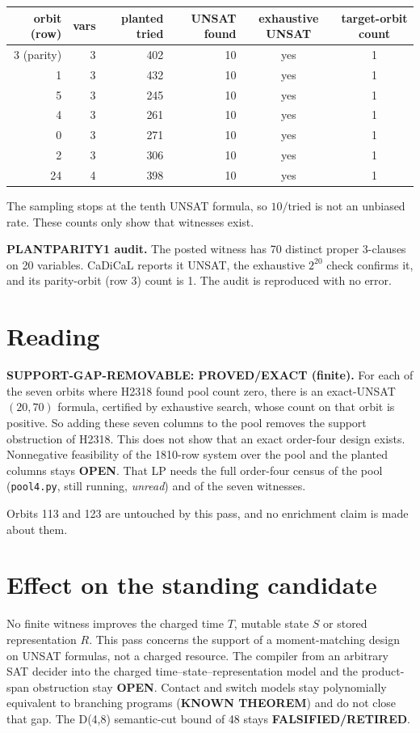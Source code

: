 \documentclass[11pt]{article}
\begin{document}
\begin{center}\begin{tabular}{rrrrcc}\toprule
orbit (row) & vars & planted tried & UNSAT found & exhaustive UNSAT & target-orbit count\\\midrule
3 (parity) & 3 & 402 & 10 & yes & 1\\
1 & 3 & 432 & 10 & yes & 1\\
5 & 3 & 245 & 10 & yes & 1\\
4 & 3 & 261 & 10 & yes & 1\\
0 & 3 & 271 & 10 & yes & 1\\
2 & 3 & 306 & 10 & yes & 1\\
24 & 4 & 398 & 10 & yes & 1\\\bottomrule
\end{tabular}\end{center}
The sampling stops at the tenth UNSAT formula, so $10/\text{tried}$ is not an unbiased rate. These counts only show that witnesses exist.

\textbf{PLANTPARITY1 audit.} The posted witness has 70 distinct proper 3-clauses on 20 variables. CaDiCaL reports it UNSAT, the exhaustive $2^{20}$ check confirms it, and its parity-orbit (row 3) count is 1. The audit is reproduced with no error.

\section*{Reading}
\textbf{SUPPORT-GAP-REMOVABLE: PROVED/EXACT (finite).} For each of the seven orbits where H2318 found pool count zero, there is an exact-UNSAT $(20,70)$ formula, certified by exhaustive search, whose count on that orbit is positive. So adding these seven columns to the pool removes the support obstruction of H2318. This does not show that an exact order-four design exists. Nonnegative feasibility of the 1810-row system over the pool and the planted columns stays \textbf{OPEN}. That LP needs the full order-four census of the pool (\texttt{pool4.py}, still running, \emph{unread}) and of the seven witnesses.

Orbits 113 and 123 are untouched by this pass, and no enrichment claim is made about them.

\section*{Effect on the standing candidate}
No finite witness improves the charged time $T$, mutable state $S$ or stored representation $R$. This pass concerns the support of a moment-matching design on UNSAT formulas, not a charged resource. The compiler from an arbitrary SAT decider into the charged time--state--representation model and the product-span obstruction stay \textbf{OPEN}. Contact and switch models stay polynomially equivalent to branching programs (\textbf{KNOWN THEOREM}) and do not close that gap. The D(4,8) semantic-cut bound of 48 stays \textbf{FALSIFIED/RETIRED}.
\end{document}

